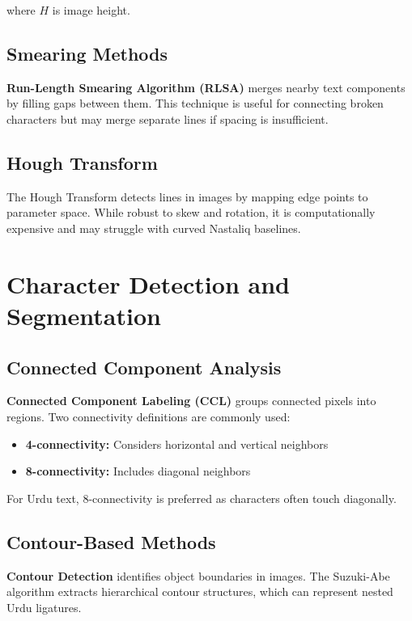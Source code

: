 \documentclass[12pt,a4paper,oneside]{report}
\begin{document}
where $H$ is image height.

\subsection{Smearing Methods}

\textbf{Run-Length Smearing Algorithm (RLSA)} \cite{wong1982document} merges nearby text components by filling gaps between them. This technique is useful for connecting broken characters but may merge separate lines if spacing is insufficient.

\subsection{Hough Transform}

The Hough Transform \cite{duda1972use} detects lines in images by mapping edge points to parameter space. While robust to skew and rotation, it is computationally expensive and may struggle with curved Nastaliq baselines.

\section{Character Detection and Segmentation}

\subsection{Connected Component Analysis}

\textbf{Connected Component Labeling (CCL)} \cite{rosenfeld1966sequential} groups connected pixels into regions. Two connectivity definitions are commonly used:
\begin{itemize}
    \item \textbf{4-connectivity:} Considers horizontal and vertical neighbors
    \item \textbf{8-connectivity:} Includes diagonal neighbors
\end{itemize}

For Urdu text, 8-connectivity is preferred as characters often touch diagonally.

\subsection{Contour-Based Methods}

\textbf{Contour Detection} identifies object boundaries in images. The Suzuki-Abe algorithm \cite{suzuki1985topological} extracts hierarchical contour structures, which can represent nested Urdu ligatures.
\end{document}
